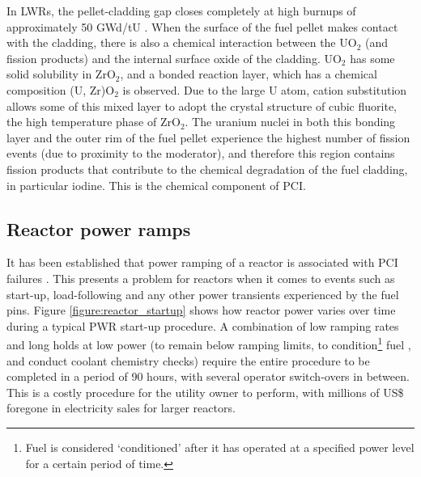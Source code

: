 In LWRs, the pellet-cladding gap closes completely at high burnups of approximately 50 GWd/tU \cite{Nogita1997, Suzuki2006, Rudling2008}. When the surface of the fuel pellet makes contact with the cladding, there is also a chemical interaction between the UO$_{2}$ (and fission products) and the internal surface oxide of the cladding. UO$_{2}$ has some solid solubility in ZrO$_{2}$, and a bonded reaction layer, which has a chemical composition (U, Zr)O$_{2}$ is observed. Due to the large U atom, cation substitution allows some of this mixed layer to adopt the crystal structure of cubic fluorite, the high temperature phase of ZrO$_{2}$. The uranium nuclei in both this bonding layer and the outer rim of the fuel pellet experience the highest number of fission events (due to proximity to the moderator), and therefore this region contains fission products that contribute to the chemical degradation of the fuel cladding, in particular iodine. This is the chemical component of PCI.

\subsection{Reactor power ramps}

It has been established that power ramping of a reactor is associated with PCI failures \cite{penn1977candu, MacDonald1979, Hardy1977198, Knaab1987}. This presents a problem for reactors when it comes to events such as start-up, load-following and any other power transients experienced by the fuel pins. Figure \ref{figure:reactor_startup} shows how reactor power varies over time during a typical PWR start-up procedure. A combination of low ramping rates and long holds at low power (to remain below ramping limits, to condition\footnote{Fuel is considered `conditioned' after it has operated at a specified power level for a certain period of time.} fuel \cite{billaux2005pellet}, and conduct coolant chemistry checks) require the entire procedure to be completed in a period of 90 hours, with several operator switch-overs in between. This is a costly procedure for the utility owner to perform, with millions of US\$ foregone in electricity sales for larger reactors.

